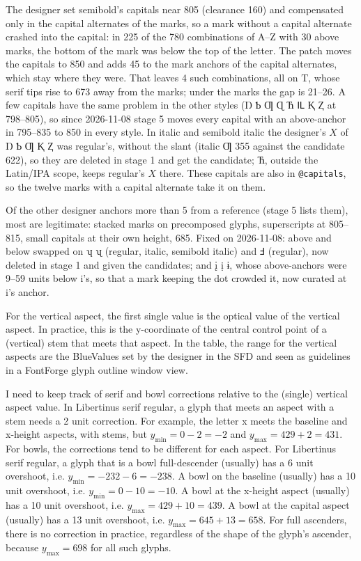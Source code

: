 \documentclass[landscape]{article}
\begin{document}
The designer set semibold's capitals near 805 (clearance 160) and compensated only in the capital alternates of the marks,
so a mark without a capital alternate crashed into the capital: in 225 of the 780 combinations of A--Z with 30 above marks, the bottom of the mark was below the top of the letter.
The patch moves the capitals to 850 and adds 45 to the mark anchors of the capital alternates, which stay where they were.
That leaves 4 such combinations, all on T, whose serif tips rise to 673 away from the marks; under the marks the gap is 21--26.
A few capitals have the same problem in the other styles (Ŋ Ƅ Ƣ Ɋ Ћ Ỻ Ⱪ Ⱬ at 798--805), so since 2026-11-08 stage 5 moves every capital with an above-anchor in 795--835 to 850 in every style.
In italic and semibold italic the designer's $X$ of Ŋ Ƅ Ƣ Ⱪ Ⱬ was regular's, without the slant (italic Ƣ 355 against the candidate 622), so they are deleted in stage 1 and get the candidate;
Ћ, outside the Latin/IPA scope, keeps regular's $X$ there.
These capitals are also in \verb|@capitals|, so the twelve marks with a capital alternate take it on them.

Of the other designer anchors more than 5 from a reference (stage 5 lists them), most are legitimate: stacked marks on precomposed glyphs, superscripts at 805--815, small capitals at their own height, 685.
Fixed on 2026-11-08: above and below swapped on ʮ ʯ (regular, italic, semibold italic) and Ⅎ (regular), now deleted in stage 1 and given the candidates;
and į ị ɨ, whose above-anchors were 9--59 units below i's, so that a mark keeping the dot crowded it, now curated at i's anchor.

For the vertical aspect, the first single value is the optical value of the vertical aspect.
In practice, this is the y-coordinate of the central control point of a (vertical) stem that meets that aspect.
In the table, the range for the vertical aspects are the BlueValues set by the designer in the SFD 
and seen as guidelines in a FontForge glyph outline window view.

I need to keep track of serif and bowl corrections relative to the (single) vertical aspect value.
In Libertinus serif regular, a glyph that meets an aspect with a stem needs a 2 unit correction.
For example, the letter x meets the baseline and x-height aspects, with stems, but 
$y_\mathrm{min} = 0 - 2 = -2$ and $y_\mathrm{max} = 429 + 2 = 431$.
For bowls, the corrections tend to be different for each aspect.
For  Libertinus serif regular, a glyph that is a bowl full-descender (usually) has a 6 unit overshoot, 
i.e. $y_\mathrm{min} = -232 -6 = -238$.
A bowl on the baseline (usually) has a 10 unit overshoot, i.e. $y_\mathrm{min} = 0 -10 = -10$.
A bowl at the x-height aspect (usually) has a 10 unit overshoot, i.e. $y_\mathrm{max} = 429 + 10 = 439$.
A bowl at the capital aspect (usually) has a 13 unit overshoot, i.e. $y_\mathrm{max} = 645 + 13 = 658$.
For full ascenders, there is no correction in practice, regardless of the shape of the glyph's ascender, 
because $y_\mathrm{max} = 698$ for all such glyphs.
\end{document}
